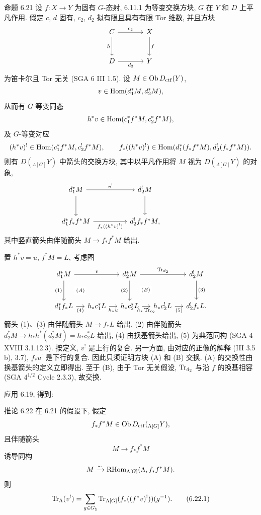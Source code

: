 \begin{statement}{命题 6.21}
设 $f:X\to Y$ 为固有 $G$-态射, 6.11.1 为等变交换方块, $G$ 在 $Y$ 和 $D$ 上平凡作用. 假定 $c$, $d$ 固有, $c_2$, $d_2$ 拟有限且具有有限 Tor 维数, 并且方块
\[
\begin{tikzcd}[column sep=large,row sep=large]
C \arrow[r,"c_2"] \arrow[d,"h"'] & X \arrow[d,"f"]\\
D \arrow[r,"d_2"'] & Y
\end{tikzcd}
\]
为笛卡尔且 Tor 无关 (SGA 6 III 1.5). 设 $M\in\operatorname{Ob} D_{\mathrm{ctf}}(Y)$,
\[
v\in\operatorname{Hom}(d_1^*M,d_2^*M),
\]
从而有 $G$-等变同态
\[
h^*v\in\operatorname{Hom}(c_1^*f^*M,c_2^*f^*M),
\]
及 $G$-等变对应
\[
(h^*v)^!\in\operatorname{Hom}(c_1^*f^*M,c_2^!f^*M),
\qquad
f_*((h^*v)^!)\in\operatorname{Hom}(d_1^*(f_*f^*M),d_2^!(f_*f^*M)).
\]
则有 $D({}_{\Lambda[G]}Y)$ 中箭头的交换方块, 其中以平凡作用将 $M$ 视为 $D({}_{\Lambda[G]}Y)$ 的对象,
\[
\begin{tikzcd}[column sep=huge,row sep=large]
d_1^*M \arrow[r,"v^!"] \arrow[d] & d_2^!M \arrow[d] & {}\\
d_1^*f_*f^*M \arrow[r,"f_*((h^*v)^!)"'] & d_2^!f_*f^*M,
\end{tikzcd}
\]
其中竖直箭头由伴随箭头 $M\to f_*f^*M$ 给出.
\end{statement}

置 $h^*v=u$, $f^*M=L$, 考虑图
\[
\begin{tikzcd}[column sep=1.2em,row sep=large]
d_1^*M \arrow[rr,"v"] \arrow[d,"(1)"'] \arrow[dr,phantom,"\scriptstyle(A)" description] &&
d_2^*M \arrow[rr,"\Tr_{d_2}"] \arrow[d,"(2)"'] \arrow[dr,phantom,"\scriptstyle(B)" description] &&
d_2^!M \arrow[d,"(3)"]\\
d_1^*f_*L \arrow[r,"(4)"'] &
h_*c_1^*L \arrow[r,"h_*u"'] &
h_*c_2^*L \arrow[r,"h_*\Tr_{c_2}"'] &
h_*c_2^!L \arrow[r,"(5)"'] &
d_2^!f_*L .
\end{tikzcd}
\]
箭头 (1)、(3) 由伴随箭头 $M\to f_*L$ 给出, (2) 由伴随箭头 $d_2^*M\to h_*h^*(d_2^*M)=h_*c_2^*L$ 给出, (4) 由换基箭头给出, (5) 为典范同构 (SGA 4 XVIII 3.1.12.3). 按定义, $v^!$ 是上行的复合. 另一方面, 由对应的正像的解释 (III 3.5 b), 3.7), $f_*u^!$ 是下行的复合. 因此只须证明方块 (A) 和 (B) 交换. (A) 的交换性由换基箭头的定义立即得出. 至于 (B), 由于 Tor 无关假设, $\operatorname{Tr}_{d_2}$ 与沿 $f$ 的换基相容 (SGA $4^{1/2}$ Cycle 2.3.3), 故交换.

应用 6.19, 得到:

\begin{statement}{推论 6.22}
在 6.21 的假设下, 假定
\[
f_*f^*M\in\operatorname{Ob} D_{\mathrm{ctf}}({}_{\Lambda[G]}Y),
\]
且伴随箭头
\[
M\to f_*f^*M
\]
诱导同构
\[
M\xrightarrow{\sim}\mathrm{RHom}_{\Lambda[G]}(\Lambda,f_*f^*M).
\]
则
\begin{equation}
\operatorname{Tr}_{\Lambda}(v^!)=
\sum_{g\in G_{\natural}}\operatorname{Tr}_{\Lambda[G]}(f_*((f^*v)^!))(g^{-1}).
\tag{6.22.1}
\end{equation}
\end{statement}

